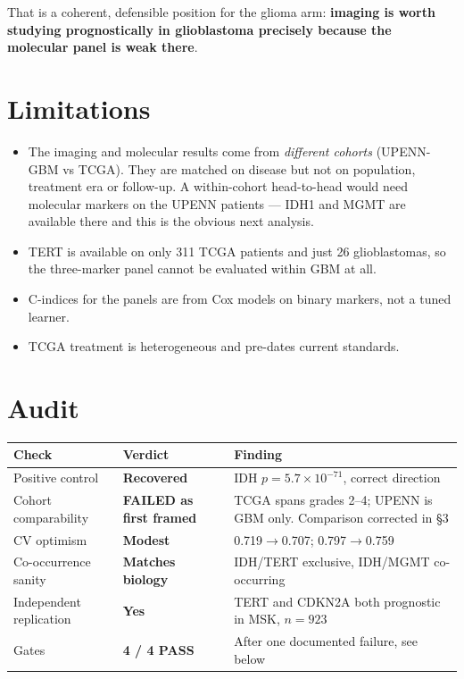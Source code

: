\documentclass[11pt,a4paper]{article}
\begin{document}
\noindent
That is a coherent, defensible position for the glioma arm: \textbf{imaging is worth
studying prognostically in glioblastoma precisely because the molecular panel is weak
there}.

\section{Limitations}

\begin{itemize}[leftmargin=1.4em,nosep]
\item The imaging and molecular results come from \emph{different cohorts} (UPENN-GBM vs
TCGA). They are matched on disease but not on population, treatment era or follow-up. A
within-cohort head-to-head would need molecular markers on the UPENN patients --- IDH1 and
MGMT are available there and this is the obvious next analysis.
\item TERT is available on only 311 TCGA patients and just 26 glioblastomas, so the
three-marker panel cannot be evaluated within GBM at all.
\item C-indices for the panels are from Cox models on binary markers, not a tuned learner.
\item TCGA treatment is heterogeneous and pre-dates current standards.
\end{itemize}

\section{Audit}

\begin{center}
\begin{tabular}{@{}llp{7.2cm}@{}}
\toprule
\textbf{Check} & \textbf{Verdict} & \textbf{Finding} \\
\midrule
Positive control & \textbf{Recovered} & IDH $p=5.7\times10^{-71}$, correct direction \\
Cohort comparability & \textbf{FAILED as first framed} & TCGA spans grades 2--4; UPENN is GBM only. Comparison corrected in \S3 \\
CV optimism & \textbf{Modest} & 0.719$\to$0.707; 0.797$\to$0.759 \\
Co-occurrence sanity & \textbf{Matches biology} & IDH/TERT exclusive, IDH/MGMT co-occurring \\
Independent replication & \textbf{Yes} & TERT and CDKN2A both prognostic in MSK, $n=923$ \\
Gates & \textbf{4 / 4 PASS} & After one documented failure, see below \\
\bottomrule
\end{tabular}
\end{center}
\end{document}

